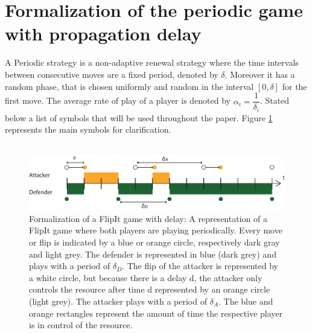 \section{Formalization of the periodic game with propagation delay}
\label{ch2:periodicvirus}

 A Periodic strategy is a non-adaptive renewal strategy where the time intervals between consecutive moves are a fixed period, denoted by $\delta$. Moreover it has a random phase, that is chosen uniformly and random in the interval $[0,\delta]$ for the first move. The average rate of play of a player is denoted by $\alpha_{i} = \dfrac{1}{\delta_{i}}$. Stated below a list of symbols that will be used throughout the paper. Figure \ref{FlipItDelay} represents the main symbols for clarification.\\
~~\\

\begin{figure}[hbtp]
\centering
\includegraphics[scale=0.7]{Images/DefFlip.pdf}
\caption{Formalization of a FlipIt game with delay: A representation of a FlipIt game where both players are playing periodically. Every move or flip is indicated by a blue or orange circle, respectively dark gray and light grey.  The defender is represented in blue (dark grey) and plays with a period of $\delta_{D}$. The flip of the attacker is represented by a white circle, but because there is a delay d, the attacker only controls the resource after time d represented by an orange circle (light grey). The attacker plays with a period of $\delta_{A}$. The blue and orange rectangles represent the amount of time the respective player is in control of the resource.}
\label{FlipItDelay}
\end{figure}

